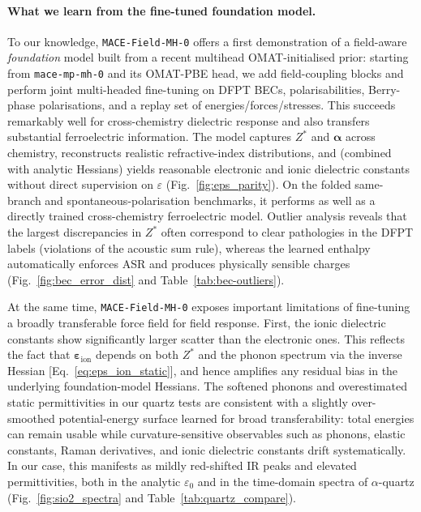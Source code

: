 \documentclass[aps,physrev,graphicx,amsmath,amssymb,
               reprint,superscriptaddress]{revtex4-2}
\begin{document}
\paragraph*{What we learn from the fine-tuned foundation model.}
To our knowledge, \texttt{MACE-Field-MH-0} offers a first demonstration of a field-aware \emph{foundation} model built from a recent multihead OMAT-initialised prior: starting from \texttt{mace-mp-mh-0} and its OMAT-PBE head, we add field-coupling blocks and perform joint multi-headed fine-tuning on DFPT BECs, polarisabilities, Berry-phase polarisations, and a replay set of energies/forces/stresses. This succeeds remarkably well for cross-chemistry dielectric response and also transfers substantial ferroelectric information. The model captures $Z^*$ and $\boldsymbol\alpha$ across chemistry, reconstructs
realistic refractive-index distributions, and (combined with analytic Hessians) yields reasonable electronic
and ionic dielectric constants without direct supervision on $\varepsilon$ (Fig.~\ref{fig:eps_parity}). On the folded same-branch and spontaneous-polarisation benchmarks, it performs as well as a directly trained cross-chemistry ferroelectric model. Outlier analysis reveals that the largest discrepancies in $Z^*$ often correspond to clear pathologies in the DFPT
labels (violations of the acoustic sum rule), whereas the learned enthalpy automatically enforces ASR and produces physically sensible charges (Fig.~\ref{fig:bec_error_dist} and Table~\ref{tab:bec-outliers}).

At the same time, \texttt{MACE-Field-MH-0} exposes important limitations of fine-tuning a broadly transferable force field for field response. First, the ionic dielectric constants show significantly larger scatter than the electronic ones. This reflects the fact that $\boldsymbol{\varepsilon}_{\mathrm{ion}}$ depends on both $Z^*$ and the phonon spectrum via the inverse Hessian [Eq.~\eqref{eq:eps_ion_static}], and hence amplifies any residual bias in the
underlying foundation-model Hessians. The softened phonons and overestimated static permittivities in our quartz tests are consistent with a slightly over-smoothed potential-energy surface learned for broad transferability: total energies can remain usable while curvature-sensitive observables such as phonons, elastic constants, Raman derivatives, and ionic dielectric constants drift systematically. In our case, this manifests as mildly red-shifted IR peaks and elevated permittivities, both in the analytic $\varepsilon_0$ and in the time-domain spectra of $\alpha$-quartz (Fig.~\ref{fig:sio2_spectra} and Table~\ref{tab:quartz_compare}).
\end{document}
